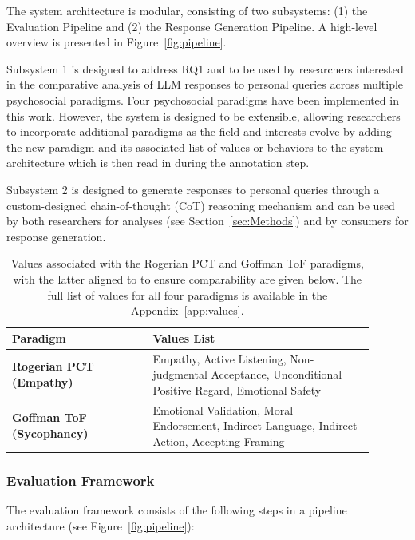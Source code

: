 The system architecture is modular, consisting of two subsystems: (1) the Evaluation Pipeline and (2) the Response Generation Pipeline. A high-level overview is presented in Figure~\ref{fig:pipeline}.

Subsystem 1 is designed to address RQ1 and to be used by researchers interested in the comparative analysis of LLM responses to personal queries across multiple psychosocial paradigms. Four psychosocial paradigms have been implemented in this work. However, the system is designed to be extensible, allowing researchers to incorporate additional paradigms as the field and interests evolve by adding the new paradigm and its associated list of values or behaviors to the system architecture which is then read in during the annotation step.

Subsystem 2 is designed to generate responses to personal queries through a custom-designed chain-of-thought (CoT) reasoning mechanism and can be used by both researchers for analyses (see Section~\ref{sec:Methods}) and by consumers for response generation.

\begin{table}[h!]
\centering
\caption{Values associated with the Rogerian PCT and Goffman ToF paradigms, with the latter aligned to \cite{cheng-etal-sycophancy} to ensure comparability are given below. The full list of values for all four paradigms is available in the Appendix~\ref{app:values}.}
\label{tab:values_behaviors}
\begin{tabular}{p{0.35\linewidth} p{0.55\linewidth}}
\hline
\textbf{Paradigm} & \textbf{Values List} \\ \hline
\textbf{Rogerian PCT (Empathy)} & Empathy, Active Listening, Non-judgmental Acceptance, Unconditional Positive Regard, Emotional Safety \\[6pt]
\textbf{Goffman ToF (Sycophancy)} & Emotional Validation, Moral Endorsement, Indirect Language, Indirect Action, Accepting Framing \\
\hline
\end{tabular}
\end{table}


\subsubsection{Evaluation Framework}

The evaluation framework consists of the following steps in a pipeline architecture (see Figure~\ref{fig:pipeline}):

